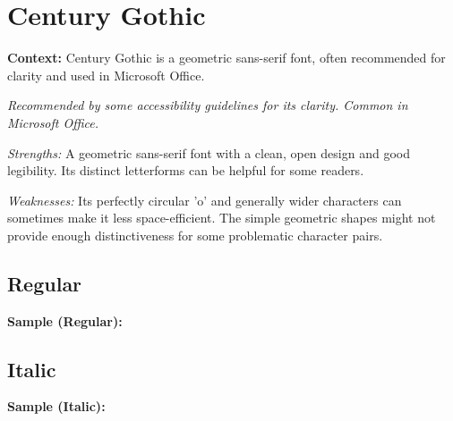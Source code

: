 \pagebreak
\section{Century Gothic}\label{app5:sec:centurygothic}
\noindent
\textbf{Context:} Century Gothic is a geometric sans-serif font, often recommended for clarity and used in Microsoft Office.

\emph{Recommended by some accessibility guidelines for its clarity. Common in Microsoft Office.}
\begin{raggedright}
	\emph{Strengths:} A geometric sans-serif font with a clean, open design and good legibility. Its distinct letterforms can be helpful for some readers.

	\emph{Weaknesses:} Its perfectly circular 'o' and generally wider characters can sometimes make it less space-efficient. The simple geometric shapes might not provide enough distinctiveness for some problematic character pairs.

	\subsection{Regular}
	\noindent\textbf{Sample (Regular):}
	\FontSample{\centurygothicfont}

	\subsection{Italic}
	\noindent\textbf{Sample (Italic):}
	\FontSample{{\centurygothicfont\itshape}}
\end{raggedright}
